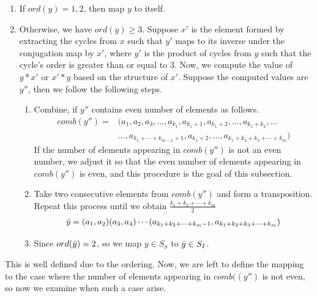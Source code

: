 \documentclass[oneside]{amsart}
\theoremstyle{plain}
\theoremstyle{definition}
\theoremstyle{remark}
\newcommand{\ord}{ord}
\begin{document}
            \begin{enumerate}
                \item If $\ord(y) = 1, 2$, then map $y$ to itself.
                \item Otherwise, we have $\ord(y) \geq 3$. Suppose $x'$ is the element formed by extracting the cycles from $x$ such that $y'$ maps to its inverse under the conjugation map by $x'$, where $y'$ is the product of cycles from $y$ such that the cycle's order is greater than or equal to $3$. Now, we compute the value of $y*x'$ or $x'*y$ based on the structure of $x'$. Suppose the computed values are $y
                {''}$, then we follow the following steps.
                \begin{enumerate}
                    \item Combine, if $y{''}$ contains even number of elements as follows.
                    \begin{align*}
                        comb(y'') = &(a_1, a_2, a_3, \ldots, a_{k_1}, a_{k_1 + 1}, a_{k_1 + 2}, \ldots , a_{k_1 + k_2}, \ldots \\
                        &\ldots,a_{k_1 + \cdots + k_{m - 1} + 1}, a_{k_1 + 2}, \ldots , a_{k_1 + k_2 + k_3 + \cdots + k_m})
                    \end{align*}
                    If the number of elements appearing in $comb(y{''})$ is not an even number, we adjust it so that the even number of elements appearing in $comb(y{''})$ is even, and this procedure is the goal of this subsection.
                    \item Take two consecutive elements from $comb(y{''})$ and form a transposition. Repeat this process until we obtain $\frac{k_1 + k_2 + \cdots + k_m}{2}$
                    \begin{align*}
                        \Bar{y} = (a_1, a_2)(a_3, a_4) \cdots (a_{k_1 + k_2 + \cdots + k_m - 1}, a_{k_1 + k_2 + k_3 + \cdots + k_m})
                    \end{align*}
                    \item Since $\ord(\Bar{y}) = 2$, so we map $y \in S_{\sigma}$ to $\Bar{y} \in S_I$.
                \end{enumerate}
            \end{enumerate}
            This is well defined due to the ordering. Now, we are left to define the mapping to the case where the number of elements appearing in $comb((y{''})$ is not even, so now we examine when such a case arise.
            
\end{document}
